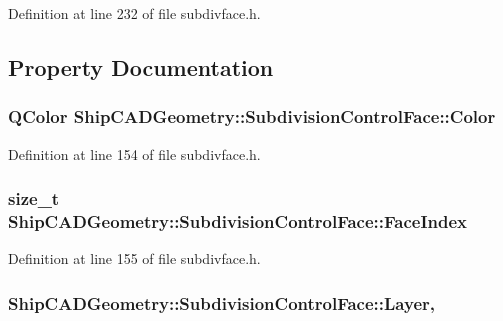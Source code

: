 Definition at line 232 of file subdivface.\-h.



\subsection{Property Documentation}
\hypertarget{classShipCADGeometry_1_1SubdivisionControlFace_a07b00d2ff994f882f1032c4a0cf2a288}{
\subsubsection[{Color}]{\setlength{\rightskip}{0pt plus 5cm}Q\-Color Ship\-C\-A\-D\-Geometry\-::\-Subdivision\-Control\-Face\-::\-Color\hspace{0.3cm}{\ttfamily [read]}}}\label{classShipCADGeometry_1_1SubdivisionControlFace_a07b00d2ff994f882f1032c4a0cf2a288}


Definition at line 154 of file subdivface.\-h.

\hypertarget{classShipCADGeometry_1_1SubdivisionControlFace_aecc2c63e4f1cc923ca3df91664c7f2ce}{
\subsubsection[{Face\-Index}]{\setlength{\rightskip}{0pt plus 5cm}size\-\_\-t Ship\-C\-A\-D\-Geometry\-::\-Subdivision\-Control\-Face\-::\-Face\-Index\hspace{0.3cm}{\ttfamily [read]}}}\label{classShipCADGeometry_1_1SubdivisionControlFace_aecc2c63e4f1cc923ca3df91664c7f2ce}


Definition at line 155 of file subdivface.\-h.

\hypertarget{classShipCADGeometry_1_1SubdivisionControlFace_a7b41fc40b007567fefacc523bd1454f0}{
\subsubsection[{Layer}]{ Ship\-C\-A\-D\-Geometry\-::\-Subdivision\-Control\-Face\-::\-Layer\hspace{0.3cm}{\ttfamily [read]}, {\ttfamily [write]}}}\label{classShipCADGeometry_1_1SubdivisionControlFace_a7b41fc40b007567fefacc523bd1454f0}


